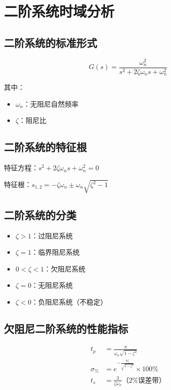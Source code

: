 \section{二阶系统时域分析}

\subsection{二阶系统的标准形式}
\[G(s) = \frac{\omega_n^2}{s^2 + 2\zeta\omega_n s + \omega_n^2}\]

其中：
\begin{itemize}
    \item $\omega_n$：无阻尼自然频率
    \item $\zeta$：阻尼比
\end{itemize}

\subsection{二阶系统的特征根}
特征方程：$s^2 + 2\zeta\omega_n s + \omega_n^2 = 0$

特征根：$s_{1,2} = -\zeta\omega_n \pm \omega_n\sqrt{\zeta^2 - 1}$

\subsection{二阶系统的分类}
\begin{itemize}
    \item $\zeta > 1$：过阻尼系统
    \item $\zeta = 1$：临界阻尼系统
    \item $0 < \zeta < 1$：欠阻尼系统
    \item $\zeta = 0$：无阻尼系统
    \item $\zeta < 0$：负阻尼系统（不稳定）
\end{itemize}

\subsection{欠阻尼二阶系统的性能指标}
\begin{align}
t_p &= \frac{\pi}{\omega_n\sqrt{1-\zeta^2}} \\
\sigma_{\%} &= e^{-\frac{\pi\zeta}{\sqrt{1-\zeta^2}}} \times 100\% \\
t_s &= \frac{3}{\zeta\omega_n} \text{（2\%误差带）}
\end{align}